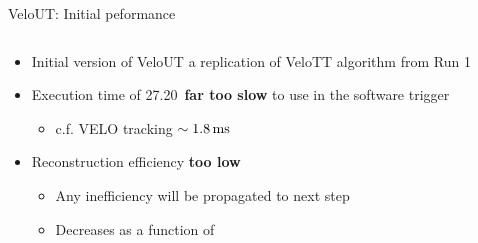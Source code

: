 \documentclass[aspectratio=1610]{beamer}
\begin{document}
\begin{frame}{VeloUT: Initial peformance}

\begin{columns}
\begin{column}{0.65\textwidth}

\begin{itemize}
  \item Initial version of VeloUT a replication of VeloTT algorithm from Run 1
\end{itemize}

\begin{itemize}
  \item Execution time of 27.20\ms ~{\bf far too slow} to use in the software trigger
  \begin{itemize}
    \item[\ding{70}] c.f. VELO tracking $\sim1.8{\mathrm{ \,ms}}$
  \end{itemize}
  \item Reconstruction efficiency {\bf too low}
  \begin{itemize}
    \item[\ding{70}] Any inefficiency will be propagated to next step
    \item[\ding{70}] Decreases as a function of \ptot
  \end{itemize}
\end{itemize}

\bigskip

\begin{mdframed}[linecolor=barcolor]
\begin{center}
\end{center}
\end{mdframed}
\end{column}


\end{columns}
\end{frame}
\end{document}
